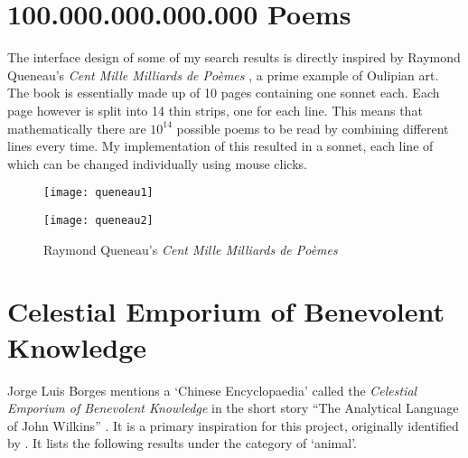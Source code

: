 \section{100.000.000.000.000 Poems}
\label{s:queneau}

The interface design of some of my search results is directly inspired by
Raymond Queneau's \textit{Cent Mille Milliards de Poèmes} \autocite*{Queneau1961}, a prime example of Oulipian art. The book is essentially made up of \num{10} pages containing one sonnet each. Each page however is split into \num{14} thin strips, one for each line. This means that mathematically there are $10^{14}$ possible poems to be read by combining different lines every time. My implementation of this resulted in a sonnet, each line of which can be changed individually using mouse clicks.

\begin{figure}[!htbp]
\centering
\begin{minipage}{.45\linewidth}
  \texttt{[image: queneau1]}
\end{minipage}
\hspace{.05\linewidth}
\begin{minipage}{.45\linewidth}
  \texttt{[image: queneau2]}
\end{minipage}
\caption[Queneau's \textit{Cent Mille Milliards de Poèmes}]{Raymond Queneau's \textit{Cent Mille Milliards de Poèmes}\footnotemark}
\label{fig:queneau12}
\end{figure}


\section{Celestial Emporium of Benevolent Knowledge}
\label{s:borges}

Jorge Luis Borges mentions a `Chinese Encyclopaedia' called the \emph{Celestial Emporium of Benevolent Knowledge} in the short story ``The Analytical Language of John Wilkins'' \autocite*{Borges2000}. It is a primary inspiration for this project, originally identified by \autocite{Hendler2011, Hendler2013}. It lists the following results under the category of `animal'.

